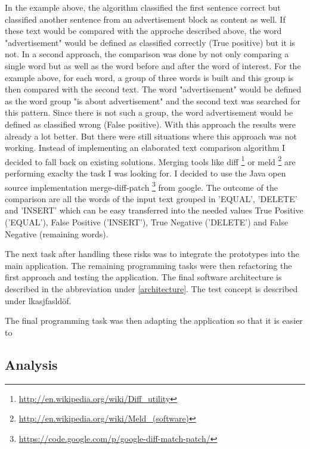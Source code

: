 In the example above, the algorithm classified the first sentence correct but classified another sentence from an advertisement block as content as well. If these text would be compared with the approche described above, the word "advertisement" would be defined as classified correctly (True positive) but it is not. 
In a second approach, the comparison was done by not only comparing a single word but as well as the word before and after the word of interest. 
For the example above, for each word, a group of three words is built and this group is then compared with the second text. The word "advertisement" would be defined as the word group "is about advertisement" and the second text was searched for this pattern. Since there is not such a group, the word advertisement would be defined as classified wrong (False positive). With this approach the results were already a lot better. But there were still situations where this approach was not working. Instead of implementing an elaborated text comparison algorithm I decided to fall back on existing solutions. Merging tools like diff \footnote{\url{http://en.wikipedia.org/wiki/Diff_utility}} or meld \footnote{\url{http://en.wikipedia.org/wiki/Meld_(software)}} are performing exaclty the task I was looking for. I decided to use the Java open source implementation merge-diff-patch \footnote{\url{https://code.google.com/p/google-diff-match-patch/}} from google.  The outcome of the comparison are all the words of the input text grouped in 'EQUAL', 'DELETE' and 'INSERT' which can be easy transferred into the needed values True Positive ('EQUAL'), False Positive ('INSERT'), True Negative ('DELETE') and False Negative (remaining words). 


The next task after handling these risks was to integrate the prototypes into the main application. The remaining programming tasks were then refactoring the first approach and testing the application. The final software architecture is described in the abbreviation under \ref{architecture}. The test concept is described under lkasjfasldöf. 

The final programming task was then adapting the application so that it is easier to 


\subsection{Analysis}

